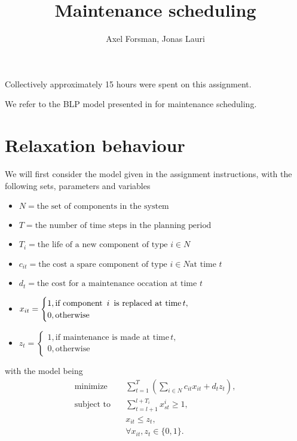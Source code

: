 \documentclass{article}
\title{Maintenance scheduling}
\author{Axel Forsman, Jonas Lauri}
\begin{document}
\maketitle
Collectively approximately 15 hours were spent on this assignment.

We refer to the BLP model presented in \autocite{almgren12}
for maintenance scheduling.

\section{Relaxation behaviour}
We will first consider the model given in the assignment instructions,
with the following sets, parameters and variables
\begin{itemize}
    \item $N = \text{the set of components in the system}$
    \item $T = \text{the number of time steps in the planning period}$
    \item $T_i = \text{the life of a new component of type } i \in N $
    \item $c_{it} = \text{the cost a spare component of type } i \in N \text{at time } t$
    \item $d_t = \text{the cost for a maintenance occation at time } t$ 
    \item $x_{it} = \begin{cases} 1, \text{if component \,} i \text{\, is replaced at time} \, t, \\ 0, \text{otherwise}
    \end{cases}$
\item $z_t = \begin{cases} 1, \text{if maintenance is made at time} \, t, \\ 0, \text{otherwise} \end{cases}$
\end{itemize}
with the model being
\begin{equation*}
	\begin{aligned}
        \text{minimize} \quad & \sum^T_{t=1} \left ( \sum_{i \in N} c_{it} x_{it} + d_t z_t \right ), \\
        \text{subject to} \quad & \sum^{l+T_i}_{t=l+1} x^i_{st} \ge 1, \\
        & x_{it} \leq z_t, \\
        & \forall x_{it}, z_t \in \{0,1\}.
    \end{aligned}
\end{equation*}
\end{document}
